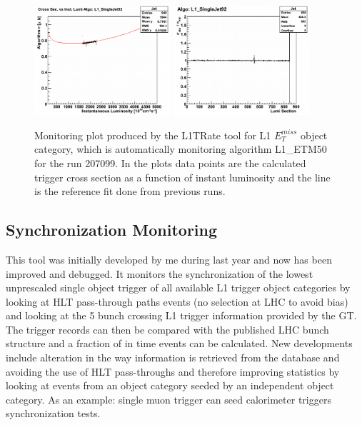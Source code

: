 \begin{figure}[!htb]
\centering
\includegraphics[width=0.45\textwidth]{Chapter03/L1TOnline/Images/Run177878_Jet_CrossSection.png}
\includegraphics[width=0.45\textwidth]{Chapter03/L1TOnline/Images/Run177878_Jet_RateCertification.png}
\caption{Monitoring plot produced by the L1TRate tool for L1 $E_T^{miss}$ object category, which is automatically
monitoring algorithm L1\_ETM50 for the run 207099. In the plots data points are the calculated trigger cross
section as a function of instant luminosity and the line is the reference fit done from previous runs.}
\label{figure_ServiceWork_L1TRate}
\end{figure}

\subsection{Synchronization Monitoring}


This tool was initially developed by me during last year and now has been improved and debugged. It monitors
the synchronization of the lowest unprescaled single object trigger of all available L1 trigger object categories
by looking at \gls{HLT} pass-through paths events (no selection at \gls{LHC} to avoid bias) and looking at the 5 bunch crossing
L1 trigger information provided by the GT. The trigger records can then be compared with the published LHC bunch
structure and a fraction of in time events can be calculated. New developments include alteration in the way
information is retrieved from the database and avoiding the use of \gls{HLT} pass-throughs and therefore improving statistics
by looking at events from an object category seeded by an independent object category. As an example: single muon
trigger can seed calorimeter triggers synchronization tests.

